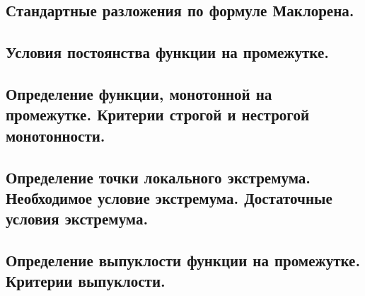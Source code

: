 \documentclass[a4paper,12pt]{article}
\theoremstyle{plain} %
\theoremstyle{definition} %
\theoremstyle{remark} %
\begin{document}
\begin{center}
\subsection*{Стандартные разложения по формуле Маклорена.                                              }
\end{center}

\begin{center}
\subsection*{Условия постоянства функции на промежутке.                                                }
\end{center}

\begin{center}
\subsection*{Определение функции, монотонной на промежутке. Критерии строгой и нестрогой монотонности. }
\end{center}

\begin{center}
\subsection*{Определение точки локального экстремума. Необходимое условие экстремума. Достаточные условия экстремума. }
\end{center}

\begin{center}
\subsection*{Определение выпуклости функции на промежутке. Критерии выпуклости.                                       }
\end{center}
\end{document}
